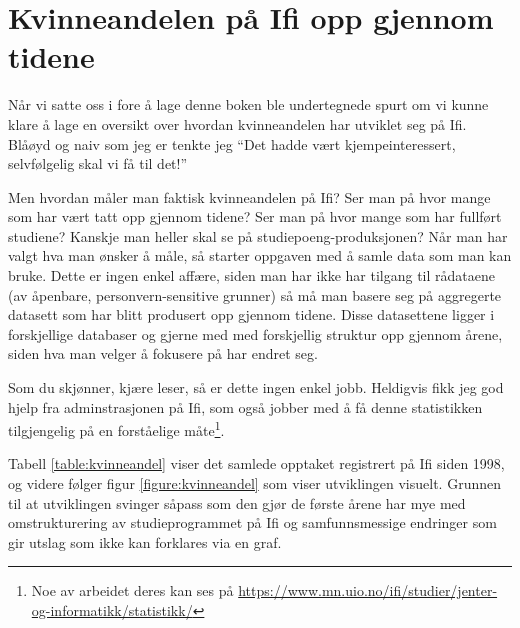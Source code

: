 \chapter*{Kvinneandelen på Ifi opp gjennom tidene}

\author{Skrevet av Arne Hassel, med god hjelp fra administrasjonen på Ifi ved Eli Berge}

Når vi satte oss i fore å lage denne boken ble undertegnede spurt om vi kunne klare å lage en oversikt over hvordan kvinneandelen har utviklet seg på Ifi. Blåøyd og naiv som jeg er tenkte jeg ``Det hadde vært kjempeinteressert, selvfølgelig skal vi få til det!'' 

Men hvordan måler man faktisk kvinneandelen på Ifi? Ser man på hvor mange som har vært tatt opp gjennom tidene? Ser man på hvor mange som har fullført studiene? Kanskje man heller skal se på studiepoeng-produksjonen? Når man har valgt hva man ønsker å måle, så starter oppgaven med å samle data som man kan bruke. Dette er ingen enkel affære, siden man har ikke har tilgang til rådataene (av åpenbare, personvern-sensitive grunner) så må man basere seg på aggregerte datasett som har blitt produsert opp gjennom tidene. Disse datasettene ligger i forskjellige databaser og gjerne med med forskjellig struktur opp gjennom årene, siden hva man velger å fokusere på har endret seg.

Som du skjønner, kjære leser, så er dette ingen enkel jobb. Heldigvis fikk jeg god hjelp fra adminstrasjonen på Ifi, som også jobber med å få denne statistikken tilgjengelig på en forståelige måte\footnote{Noe av arbeidet deres kan ses på \url{https://www.mn.uio.no/ifi/studier/jenter-og-informatikk/statistikk/}}.

Tabell \ref{table:kvinneandel} viser det samlede opptaket registrert på Ifi siden 1998, og videre følger figur \ref{figure:kvinneandel} som viser utviklingen visuelt. Grunnen til at utviklingen svinger såpass som den gjør de første årene har mye med omstrukturering av studieprogrammet på Ifi og samfunnsmessige endringer som gir utslag som ikke kan forklares via en graf.

